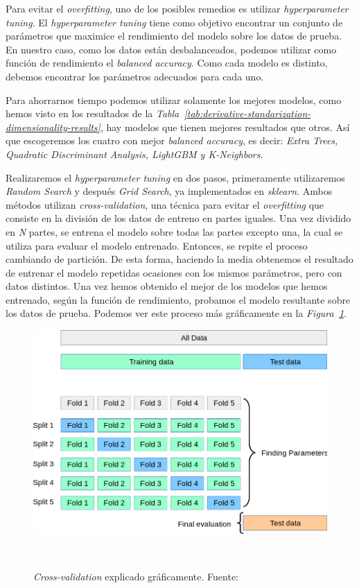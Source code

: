 Para evitar el \textit{overfitting}, uno de los posibles remedios es utilizar \textit{hyperparameter tuning}. El \textit{hyperparameter tuning} tiene como objetivo encontrar un conjunto de parámetros que maximice el rendimiento del modelo sobre los datos de prueba. En nuestro caso, como los datos están desbalanceados, podemos utilizar como función de rendimiento el \textit{balanced accuracy}. Como cada modelo es distinto, debemos encontrar los parámetros adecuados para cada uno. 

Para ahorrarnos tiempo podemos utilizar solamente los mejores modelos, como hemos visto en los resultados de la \textit{Tabla\ \ref{tab:derivative-standarization-dimensionality-results}}, hay modelos que tienen mejores resultados que otros. Así que escogeremos los cuatro con mejor \textit{balanced accuracy}, es decir: \textit{Extra Trees, Quadratic Discriminant Analysis, LightGBM y K-Neighbors}.

Realizaremos el \textit{hyperparameter tuning} en dos pasos, primeramente utilizaremos \textit{Random Search} y después \textit{Grid Search}, ya implementados en \textit{sklearn}.
Ambos métodos utilizan \textit{cross-validation}, una técnica para evitar el \textit{overfitting} que consiste en la división de los datos de entreno en partes iguales.
Una vez dividido en \textit{N} partes, se entrena el modelo sobre todas las partes excepto una, la cual se utiliza para evaluar el modelo entrenado. Entonces, se repite el 
proceso cambiando de partición. De esta forma, haciendo la media obtenemos el resultado de entrenar el modelo repetidas ocasiones con los mismos parámetros, pero con datos 
distintos. Una vez hemos obtenido el mejor de los modelos que hemos entrenado, según la función de rendimiento, probamos el modelo resultante sobre los datos de prueba.
Podemos ver este proceso más gráficamente en la \textit{Figura\ \ref{fig:cross-validation}}.

\begin{figure}[!h]
    \centering
    \includegraphics[width=0.7\linewidth]{media/images/cross-validation.png}
    \caption{\textit{Cross-validation} explicado gráficamente. Fuente:\ \cite{31Crossv20:online}}\ \label{fig:cross-validation}
\end{figure}


